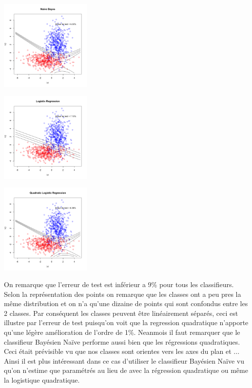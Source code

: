 \documentclass[10pt]{article}
\begin{document}
\begin{center}
	\includegraphics[width=45mm]{Figures/synth2_nb.png}
\end{center}
\begin{minipage}{.5\textwidth}
	\includegraphics[width=45mm]{Figures/synth2_logreg.png}
\end{minipage}%
\hspace{0.02\linewidth}
\begin{minipage}{.5\textwidth}
	\includegraphics[width=45mm]{Figures/synth2_logregquad.png}
\end{minipage}


On remarque que l'erreur de test est inférieur a  9\% pour tous les classifieurs. Selon la représentation des points on remarque que les classes ont a peu pres la même distribution et on n'a qu'une dizaine de  points qui sont confondus entre les 2 classes. Par conséquent les classes peuvent être  linéairement séparés, ceci est illustre par l'erreur de test puisqu'on voit que la regression quadratique n'apporte qu'une légère amélioration de l'ordre de 1\%.
Neanmois il faut remarquer que le classifieur Bayésien Naïve performe aussi bien que les régressions quadratiques. Ceci était prévisible vu que nos classes sont orientes vers les axes du plan et ... Ainsi il est plus intéressant dans ce cas d'utiliser le classifieur Bayésien Naïve vu qu'on n'estime que paramétrés au lieu de avec la régression quadratique ou même la logistique quadratique.
\end{document}
